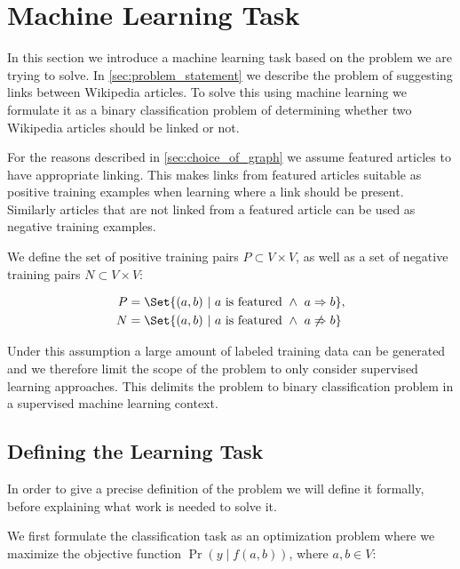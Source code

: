 \section{Machine Learning Task}\label{sec:machine_learning_task}
In this section we introduce a machine learning task based on the problem we are trying to solve. In \cref{sec:problem_statement} we describe the problem of suggesting links between Wikipedia articles. To solve this using machine learning we formulate it as a binary classification problem of determining whether two Wikipedia articles should be linked or not.

For the reasons described in \cref{sec:choice_of_graph} we assume featured articles to have appropriate linking. This makes links from featured articles suitable as positive training examples when learning where a link should be present. Similarly articles that are not linked from a featured article can be used as negative training examples.

We define the set of positive training pairs $P \subset V \times V$, as well as a set of negative training pairs $N \subset V \times V$:

\begin{align*}
P &= \Set{(a,b)\ |\ a\text{ is featured}\ \wedge\ a \Rightarrow b}, \\
N &= \Set{(a,b)\ |\ a\text{ is featured}\ \wedge\ a \not\Rightarrow b}
\end{align*}

Under this assumption a large amount of labeled training data can be generated and we therefore limit the scope of the problem to only consider supervised learning approaches. This delimits the problem to binary classification problem in a supervised machine learning context. 

\subsection{Defining the Learning Task}
In order to give a precise definition of the problem we will define it formally, before explaining what work is needed to solve it.

We first formulate the classification task as an optimization problem where we maximize the objective function $\Pr(y \mid f(a,b))$, where $a,b \in V$: 

